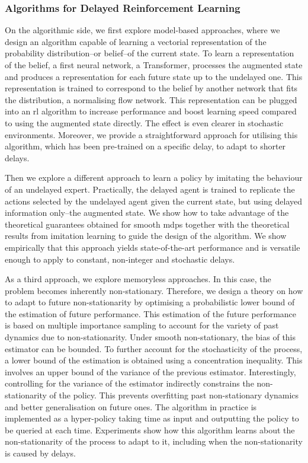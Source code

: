\subsubsection{Algorithms for Delayed Reinforcement Learning}
On the algorithmic side, we first explore model-based approaches, where we design an algorithm capable of learning a vectorial representation of the probability distribution--or belief--of the current state.
To learn a representation of the belief, a first neural network, a Transformer, processes the augmented state and produces a representation for each future state up to the undelayed one.
This representation is trained to correspond to the belief by another network that fits the distribution, a normalising flow network. 
This representation can be plugged into an \gls{rl} algorithm to increase performance and boost learning speed compared to using the augmented state directly.
The effect is even clearer in stochastic environments.
Moreover, we provide a straightforward approach for utilising this algorithm, which has been pre-trained on a specific delay, to adapt to shorter delays.


Then we explore a different approach to learn a policy by imitating the behaviour of an undelayed expert. 
Practically, the delayed agent is trained to replicate the actions selected by the undelayed agent given the current state, but using delayed information only--the augmented state.
We show how to take advantage of the theoretical guarantees obtained for smooth \glspl{mdp} together with the theoretical results from imitation learning to guide the design of the algorithm.
We show empirically that this approach yields state-of-the-art performance and is versatile enough to apply to constant, non-integer and stochastic delays. 

As a third approach, we explore memoryless approaches.
In this case, the problem becomes inherently non-stationary. 
Therefore, we design a theory on how to adapt to future non-stationarity by optimising a probabilistic lower bound of the estimation of future performance.
This estimation of the future performance is based on multiple importance sampling to account for the variety of past dynamics due to non-stationarity.
Under smooth non-stationary, the bias of this estimator can be bounded.
To further account for the stochasticity of the process, a lower bound of the estimation is obtained using a concentration inequality. 
This involves an upper bound of the variance of the previous estimator. 
Interestingly, controlling for the variance of the estimator indirectly constrains the non-stationarity of the policy.
This prevents overfitting past non-stationary dynamics and better generalisation on future ones.
The algorithm in practice is implemented as a hyper-policy taking time as input and outputting the policy to be queried at each time.
Experiments show how this algorithm learns about the non-stationarity of the process to adapt to it, including when the non-stationarity is caused by delays.

